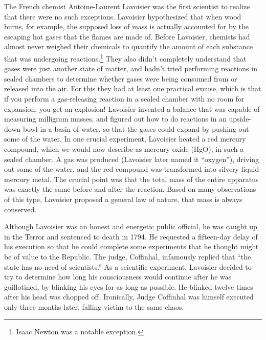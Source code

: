 The French chemist Antoine-Laurent Lavoisier was the first scientist to realize
that there were no such exceptions. Lavoisier hypothesized that
when wood burns, for example, the supposed loss of mass is actually accounted for by the
escaping hot gases that the flames are made of.
Before Lavoisier, chemists had almost never
weighed their chemicals to quantify the amount of each substance that was undergoing
reactions.\footnote{Isaac Newton was a notable exception.}
They also didn't completely understand that gases were just another
state of matter, and hadn't tried performing reactions in sealed chambers to determine
whether gases were being consumed from or released into the air. For this they had at least one
practical excuse, which is that if you perform a gas-releasing reaction in a sealed chamber
with no room for expansion, you get an explosion! Lavoisier invented a balance that was capable
of measuring milligram masses, and figured out how to do reactions in an upside-down
bowl in a basin of water, so that the gases could expand by pushing out some of the water.
In one crucial experiment, Lavoisier heated a red mercury compound, which we would now
describe as mercury oxide (HgO), in such a sealed chamber.
A gas was produced (Lavoisier later named
it ``oxygen''), driving out some of the water, and the red compound was transformed into
silvery liquid mercury metal. The crucial point was that the total mass of the entire
apparatus was exactly the same before and after the reaction. Based on many observations
of this type, Lavoisier proposed a general law of nature, that mass is always conserved.


Although Lavoisier was an honest and energetic public official, he was caught up
in the Terror and sentenced to death in 1794. 
He requested a fifteen-day
delay of his execution so that he could complete some experiments that he thought might
be of value to the Republic. 
The judge, Coffinhal, infamously replied that ``the state has no need of scientists.''
As a scientific
experiment, Lavoisier decided to try to determine how long his consciousness would continue
after he was guillotined, by blinking his eyes for as long as possible. He blinked twelve times
after his head was chopped off. Ironically, Judge Coffinhal 
was himself executed only three months later, falling victim to the same chaos.

